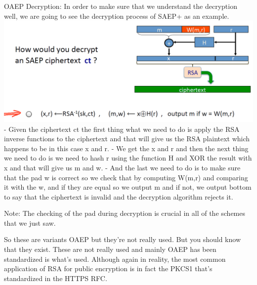 \documentclass[11pt]{article}
\makeatletter
\def\maxwidth{\ifdim\Gin@nat@width>\linewidth\linewidth
    \else\Gin@nat@width\fi}
\let\Oldincludegraphics\includegraphics
\renewcommand{\includegraphics}[1]{\Oldincludegraphics[width=.8\maxwidth]{#1}}
\makeatother
\begin{document}
OAEP Decryption: In order to make sure that we understand the decryption
well, we are going to see the decryption process of SAEP+ as an example.
\includegraphics{./Images/DecryptSAEP.png} - Given the ciphertext ct the
first thing what we need to do is apply the RSA inverse functions to the
ciphertext and that will give us the RSA plaintext which happens to be
in this case x and r. - We get the x and r and then the next thing we
need to do is we need to hash r using the function H and XOR the result
with x and that will give us m and w. - And the last we need to do is to
make sure that the pad w is correct so we check that by computing W(m,r)
and comparing it with the w, and if they are equal so we output m and if
not, we output bottom to say that the ciphertext is invalid and the
decryption algorithm rejects it.

Note: The checking of the pad during decryption is crucial in all of the
schemes that we just saw.

So these are variants OAEP but they're not really used. But you should
know that they exist. These are not really used and mainly OAEP has been
standardized is what's used. Although again in reality, the most common
application of RSA for public encryption is in fact the PKCS1 that's
standardized in the HTTPS RFC.
\end{document}
